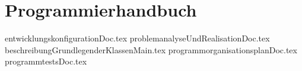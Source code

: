\part{Programmierhandbuch}
{entwicklungskonfigurationDoc.tex}
{problemanalyseUndRealisationDoc.tex}
{beschreibungGrundlegenderKlassenMain.tex}
{programmorganisationsplanDoc.tex}
{programmtestsDoc.tex}